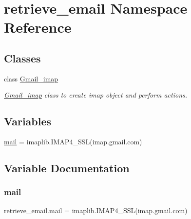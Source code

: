\hypertarget{namespaceretrieve__email}{}\section{retrieve\+\_\+email Namespace Reference}
\label{namespaceretrieve__email}
\subsection*{Classes}
\begin{DoxyCompactItemize}
\item 
class \hyperlink{classretrieve__email_1_1Gmail__imap}{Gmail\+\_\+imap}
\begin{DoxyCompactList}\small\item\em \hyperlink{classretrieve__email_1_1Gmail__imap}{Gmail\+\_\+imap} class to create imap object and perform actions. \end{DoxyCompactList}\end{DoxyCompactItemize}
\subsection*{Variables}
\begin{DoxyCompactItemize}
\item 
\hyperlink{namespaceretrieve__email_a7967d9ae6d207705cde5f276ced05888}{mail} = imaplib.\+I\+M\+A\+P4\+\_\+\+S\+SL(\textquotesingle{}imap.\+gmail.\+com\textquotesingle{})
\end{DoxyCompactItemize}


\subsection{Variable Documentation}
\mbox{\label{namespaceretrieve__email_a7967d9ae6d207705cde5f276ced05888}} 
\subsubsection{\texorpdfstring{mail}{mail}}
{\footnotesize\ttfamily retrieve\+\_\+email.\+mail = imaplib.\+I\+M\+A\+P4\+\_\+\+S\+SL(\textquotesingle{}imap.\+gmail.\+com\textquotesingle{})}

